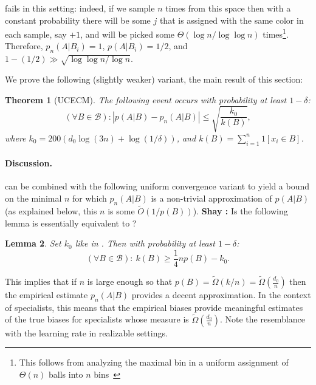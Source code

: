 \documentclass{article}
\def\B{{\mathcal B}}
\newtheorem{theorem}{Theorem}
\newtheorem{lemma}[theorem]{Lemma}
\newcommand{\comment}[3]{{\color{#1} {\bf #2 :} #3}}
\newcommand{\shay}[1]{\comment{purple}{Shay}{#1}}
\begin{document}
 fails in this setting:
indeed, if we sample $n$ times from this space 
then with a constant probability there will be some  $j$
that is assigned with the same color in each sample,  say $+1$, 
and will be picked some $\Theta(\log n/\log\log n)$ times\footnote{{This follows from analyzing the maximal bin
in a uniform assignment of $\Theta(n)$ balls into $n$ bins~\cite{bins}}}.
Therefore, $p_n(A\vert B_i) = 1$, $p(A\vert B_i)=1/2$,
and $1-(1/2) \gg \sqrt{\log\log n/\log n}$.

We prove the following (slightly weaker) variant, the main result of this section:
\begin{theorem}[UCECM]\label{thm:UCECM}
The following event occurs with probability at least $1-\delta$:
\[\left(\forall B\in\B\right):\left\lvert p(A \vert B) - p_n(A \vert B) \right\rvert \leq 
\sqrt{\frac{k_0}{k(B)}},\]
where $k_0 = 200 \left(d_0 \log(3n) + \log(1/\delta)\right)$, and $k(B) = \sum_{i=1}^n 1[x_i\in B]$.
\end{theorem}

\paragraph{Discussion.}

 can be combined with the following uniform convergence 
variant to yield a bound on the minimal $n$ for which $p_n(A \vert B)$ 
is a non-trivial approximation of $p(A \vert B)$
(as explained below, this $n$ is some $\tilde O\left(1/p(B)\right)$).
\shay{Is the following lemma is essentially equivalent to \Cref{lemma:points-in-balls}?}
\begin{lemma}\label{lem:uconeside}
Set $k_0$ like in . Then with probability at least $1-\delta$:
\[
(\forall B\in \B):~ k(B) \geq \frac{1}{4}np(B) - {k_0}.
\]
\end{lemma}
This implies that if $n$ is large enough so that $p(B)=\tilde\Omega(k/n)=\tilde\Omega\left(\frac{d_0}{n}\right)$
then the empirical estimate $p_n(A\vert B)$ provides a decent approximation.
In the context of specialists, this means that the empirical
biases provide meaningful estimates of the true biases 
for specialists whose measure is $\tilde\Omega\left(\frac{d_0}{n}\right)$.
Note the resemblance with the learning rate in realizable settings.
%
\end{document}
